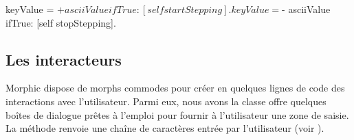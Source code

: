 \documentclass[a4paper,10pt,twoside]{book}
\begin{document}

\begin{code}{}
	keyValue = $+ asciiValue 
		ifTrue: [self startStepping].
	keyValue = $- asciiValue
		ifTrue: [self stopStepping].
\end{code}


\subsection{Les interacteurs} %

Morphic dispose de morphs commodes pour créer en quelques lignes de
code des interactions avec l'utilisateur. Parmi eux, nous avons la
classe  offre quelques boîtes de dialogue
prêtes \`a l'emploi pour fournir \`a l'utilisateur une zone de saisie.
La méthode  renvoie
une chaîne de caractères entrée par l'utilisateur (voir
).
\end{document}
